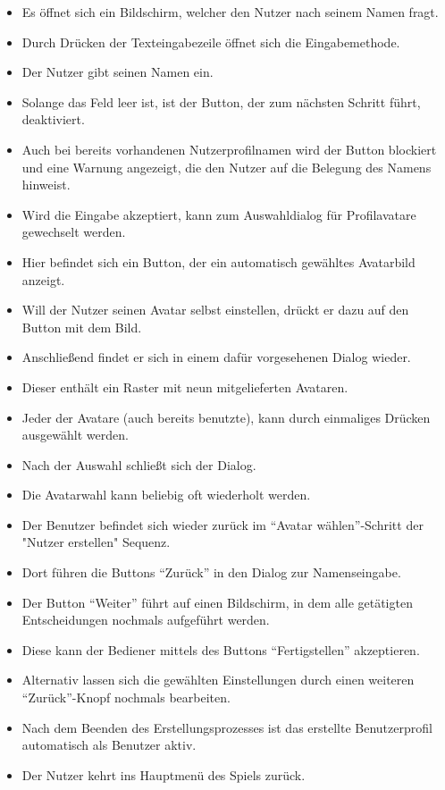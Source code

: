 \begin{itemize}
\item Es öffnet sich ein Bildschirm, welcher den Nutzer nach seinem Namen fragt.
\item Durch Drücken der Texteingabezeile öffnet sich die Eingabemethode.
\item Der Nutzer gibt seinen Namen ein. 
\item Solange das Feld leer ist, ist der Button, der zum nächsten Schritt führt, deaktiviert.
\item  Auch bei bereits vorhandenen Nutzerprofilnamen wird der Button blockiert und eine Warnung angezeigt,
die den Nutzer auf die Belegung des Namens hinweist. 
\item Wird die Eingabe akzeptiert, kann zum Auswahldialog für Profilavatare gewechselt werden.
\item Hier befindet sich ein Button, der ein automatisch gewähltes Avatarbild anzeigt.
\item Will der Nutzer seinen Avatar selbst einstellen, drückt er dazu auf den Button mit dem Bild.
\item Anschließend findet er sich in einem dafür vorgesehenen Dialog wieder.
\item Dieser enthält ein Raster mit neun mitgelieferten Avataren.
\item Jeder der Avatare (auch bereits benutzte), kann durch einmaliges Drücken ausgewählt werden.
\item Nach der Auswahl schließt sich der Dialog.
\item Die Avatarwahl kann beliebig oft wiederholt werden.
\item Der Benutzer befindet sich wieder zurück im "`Avatar wählen"'-Schritt der "Nutzer erstellen" Sequenz.
\item Dort führen die Buttons "`Zurück"' in den Dialog zur Namenseingabe.
\item Der Button "`Weiter"' führt auf einen Bildschirm, in dem alle getätigten Entscheidungen
nochmals aufgeführt werden. 
\item Diese kann der Bediener mittels des Buttons "`Fertigstellen"' akzeptieren.
\item Alternativ lassen sich die gewählten Einstellungen durch einen weiteren "`Zurück"'-Knopf 
nochmals bearbeiten.
\item Nach dem Beenden des Erstellungsprozesses ist das erstellte 
Benutzerprofil automatisch als Benutzer aktiv.
\item Der Nutzer kehrt ins Hauptmenü des Spiels zurück.
\end{itemize}
